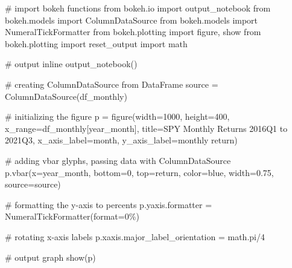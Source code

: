 \documentclass[
  letterpaper,
  DIV=11,
  numbers=noendperiod]{scrreprt}
\newenvironment{Shaded}{\begin{snugshade}}{\end{snugshade}}
\newcommand{\BuiltInTok}[1]{\textcolor[rgb]{0.00,0.23,0.31}{#1}}
\newcommand{\CommentTok}[1]{\textcolor[rgb]{0.37,0.37,0.37}{#1}}
\newcommand{\DecValTok}[1]{\textcolor[rgb]{0.68,0.00,0.00}{#1}}
\newcommand{\FloatTok}[1]{\textcolor[rgb]{0.68,0.00,0.00}{#1}}
\newcommand{\ImportTok}[1]{\textcolor[rgb]{0.00,0.46,0.62}{#1}}
\newcommand{\NormalTok}[1]{\textcolor[rgb]{0.00,0.23,0.31}{#1}}
\newcommand{\OperatorTok}[1]{\textcolor[rgb]{0.37,0.37,0.37}{#1}}
\newcommand{\StringTok}[1]{\textcolor[rgb]{0.13,0.47,0.30}{#1}}
\begin{document}
\begin{Shaded}
\begin{Highlighting}[]
\CommentTok{\# import bokeh functions}
\ImportTok{from}\NormalTok{ bokeh.io }\ImportTok{import}\NormalTok{ output\_notebook}
\ImportTok{from}\NormalTok{ bokeh.models }\ImportTok{import}\NormalTok{ ColumnDataSource}
\ImportTok{from}\NormalTok{ bokeh.models }\ImportTok{import}\NormalTok{ NumeralTickFormatter}
\ImportTok{from}\NormalTok{ bokeh.plotting }\ImportTok{import}\NormalTok{ figure, show}
\ImportTok{from}\NormalTok{ bokeh.plotting }\ImportTok{import}\NormalTok{ reset\_output}
\ImportTok{import}\NormalTok{ math}

\CommentTok{\# output inline}
\NormalTok{output\_notebook()}

\CommentTok{\# creating ColumnDataSource from DataFrame}
\NormalTok{source }\OperatorTok{=}\NormalTok{ ColumnDataSource(df\_monthly)}

\CommentTok{\# initializing the figure}
\NormalTok{p }\OperatorTok{=}\NormalTok{ figure(width}\OperatorTok{=}\DecValTok{1000}\NormalTok{, height}\OperatorTok{=}\DecValTok{400}\NormalTok{, x\_range}\OperatorTok{=}\NormalTok{df\_monthly[}\StringTok{\textquotesingle{}year\_month\textquotesingle{}}\NormalTok{], title}\OperatorTok{=}\StringTok{\textquotesingle{}SPY Monthly Returns 2016Q1 to 2021Q3\textquotesingle{}}\NormalTok{,}
\NormalTok{           x\_axis\_label}\OperatorTok{=}\StringTok{\textquotesingle{}month\textquotesingle{}}\NormalTok{, y\_axis\_label}\OperatorTok{=}\StringTok{\textquotesingle{}monthly return\textquotesingle{}}\NormalTok{)}

\CommentTok{\# adding vbar glyphs, passing data with ColumnDataSource}
\NormalTok{p.vbar(x}\OperatorTok{=}\StringTok{\textquotesingle{}year\_month\textquotesingle{}}\NormalTok{, bottom}\OperatorTok{=}\DecValTok{0}\NormalTok{, top}\OperatorTok{=}\StringTok{\textquotesingle{}return\textquotesingle{}}\NormalTok{, color}\OperatorTok{=}\StringTok{\textquotesingle{}blue\textquotesingle{}}\NormalTok{, width}\OperatorTok{=}\FloatTok{0.75}\NormalTok{, source}\OperatorTok{=}\NormalTok{source)}

\CommentTok{\# formatting the y{-}axis to percents}
\NormalTok{p.yaxis.formatter }\OperatorTok{=}\NormalTok{ NumeralTickFormatter(}\BuiltInTok{format}\OperatorTok{=}\StringTok{\textquotesingle{}0\%\textquotesingle{}}\NormalTok{)}

\CommentTok{\# rotating x{-}axis labels}
\NormalTok{p.xaxis.major\_label\_orientation }\OperatorTok{=}\NormalTok{ math.pi}\OperatorTok{/}\DecValTok{4}

\CommentTok{\# output graph}
\NormalTok{show(p)}
\end{Highlighting}
\end{Shaded}
\end{document}

